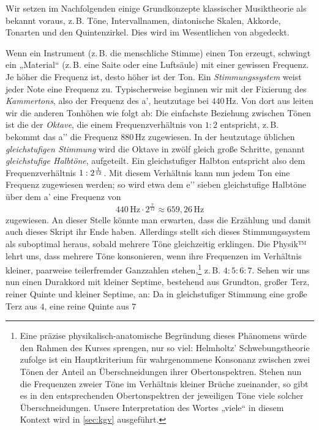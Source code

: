 Wir setzen im Nachfolgenden einige Grundkonzepte klassischer Musiktheorie als
bekannt voraus, z.\,B. Töne, Intervallnamen, diatonische Skalen, Akkorde,
Tonarten und den Quintenzirkel. Dies wird im Wesentlichen von
\cite[§\,1–6]{Skript} abgedeckt.

Wenn ein Instrument (z.\,B. die menschliche Stimme) einen Ton erzeugt, schwingt
ein „Material“ (z.\,B. eine Saite oder eine Luftsäule) mit einer gewissen
Frequenz.  Je höher die Frequenz ist, desto höher ist der Ton. Ein
\emph{Stimmungssystem} weist jeder Note eine Frequenz zu. Typischerweise
beginnen wir mit der Fixierung des \emph{Kammertons}, also der Frequenz des a’,
heutzutage bei $440$\,Hz. Von dort aus leiten wir die anderen Tonhöhen wie folgt
ab: Die einfachste Beziehung zwischen Tönen ist die der \emph{Oktave}, die einem
Frequenzverhältnis von $1:2$ entspricht, z.\,B. bekommt das a’’ die Frequenz
$880$\,Hz zugewiesen. In der heutzutage üblichen \emph{gleichstufigen Stimmung}
wird die Oktave in zwölf gleich große Schritte, genannt \emph{gleichstufige
  Halbtöne}, aufgeteilt. Ein gleichstufiger Halbton entspricht also dem
Frequenzverhältnis $1:2^{\smash{\frac1{12}}}$. Mit diesem Verhältnis kann nun
jedem Ton eine Frequenz zugewiesen werden; so wird etwa dem e’’ sieben
gleichstufige Halbtöne über dem a’ eine Frequenz von 
\[440\,\text{Hz}\cdot 2^{\frac7{12}} \approx 659{,}26\,\text{Hz}\]%
zugewiesen.  An dieser Stelle könnte man erwarten, dass die Erzählung und damit
auch dieses Skript ihr Ende haben. Allerdings stellt sich dieses
Stimmungssystem als suboptimal heraus, sobald mehrere Töne gleichzeitig
erklingen. Die Physik™ lehrt uns, dass mehrere Töne konsonieren, wenn ihre
Frequenzen im Verhältnis kleiner, paarweise teilerfremder Ganzzahlen
stehen,\footnote{Eine präzise physikalisch-anatomische Begründung dieses
  Phänomens würde den Rahmen des Kurses sprengen, nur so viel: Helmholtz’
  Schwebungstheorie \cite[§\,10–12]{HE} zufolge ist ein Hauptkriterium für
  wahrgenommene Konsonanz zwischen zwei Tönen der Anteil an Überschneidungen
  ihrer Obertonspektren. Stehen nun die Frequenzen zweier Töne im Verhältnis
  kleiner Brüche zueinander, so gibt es in den entsprechenden Obertonspektren
  der jeweiligen Töne viele solcher Überschneidungen. Unsere Interpretation
  des Wortes „viele“ in diesem Kontext wird in \cref{sec:kgv} ausgeführt.\vspace*{.4px}}
z.\,B. $4:5:6:7$. Sehen wir uns nun einen Durakkord mit kleiner Septime,
bestehend aus Grundton, großer Terz, reiner Quinte und kleiner Septime, an: Da
in gleichstufiger Stimmung eine große Terz aus $4$, eine reine Quinte aus $7$
